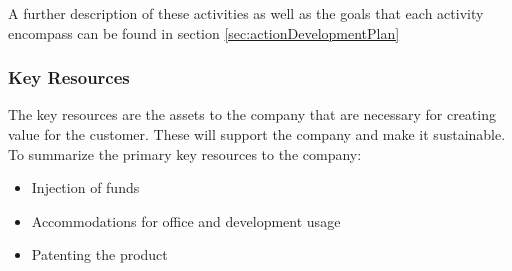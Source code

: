 A further description of these activities as well as the goals that each activity encompass can be found in section \ref{sec:actionDevelopmentPlan}
\subsubsection{Key Resources}
The key resources are the assets to the company that are necessary for creating value for the customer. These will support the company and make it sustainable.
To summarize the primary key resources to the company:
\begin{itemize}
\item Injection of funds
\item Accommodations for office and development usage
\item Patenting the product
\end{itemize}
